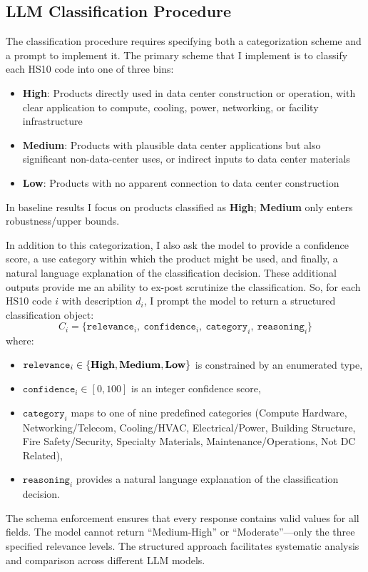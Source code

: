 \documentclass[12pt,pdftex]{article}
\begin{document}
\begin{onehalfspacing}
\subsection{LLM Classification Procedure}

The classification procedure requires specifying both a categorization scheme and a prompt to implement it. The primary scheme that I implement is to classify each HS10 code into one of three bins:
\begin{itemize}
    \item \textbf{High}: Products directly used in data center construction or operation, with clear application to compute, cooling, power, networking, or facility infrastructure
    \item \textbf{Medium}: Products with plausible data center applications but also significant non-data-center uses, or indirect inputs to data center materials
    \item \textbf{Low}: Products with no apparent connection to data center construction
\end{itemize}
In baseline results I focus on products classified as \textbf{High}; \textbf{Medium} only enters robustness/upper bounds.

In addition to this categorization, I also ask the model to provide a confidence score, a use category within which the product might be used, and finally, a natural language explanation of the classification decision. These additional outputs provide me an ability to ex-post scrutinize the classification. So, for each HS10 code $i$ with description $d_i$, I prompt the model to return a structured classification object:
\begin{equation}
    C_i = \{\texttt{relevance}_i, \ \texttt{confidence}_i, \ \texttt{category}_i, \ \texttt{reasoning}_i\}
\end{equation}
\noindent where:
\begin{itemize}
    \item $\texttt{relevance}_i \in \{\text{\textbf{High}}, \text{\textbf{Medium}}, \text{\textbf{Low}}\}$ is constrained by an enumerated type,
    \item $\texttt{confidence}_i \in [0, 100]$ is an integer confidence score,
    \item $\texttt{category}_i$ maps to one of nine predefined categories (Compute Hardware, Networking/Telecom, Cooling/HVAC, Electrical/Power, Building Structure, Fire Safety/Security, Specialty Materials, Maintenance/Operations, Not DC Related),
    \item $\texttt{reasoning}_i$ provides a natural language explanation of the classification decision.
\end{itemize}
The schema enforcement ensures that every response contains valid values for all fields. The model cannot return ``Medium-High'' or ``Moderate''---only the three specified relevance levels. The structured approach facilitates systematic analysis and comparison across different LLM models.


\end{onehalfspacing}
\end{document}
